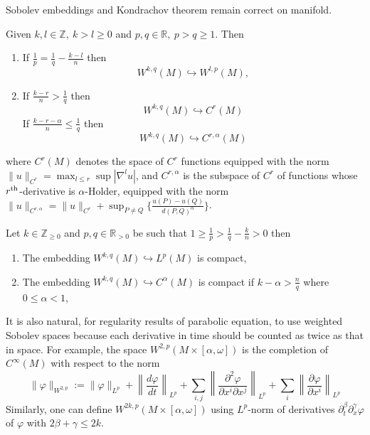 Sobolev embeddings and Kondrachov theorem remain correct on manifold. 

\begin{theorem}
\label{thm:Sobolev-Rn-d}
Given \(k,l\in \mathbb{Z},\ k>l \geq 0\) and \(p,q\in \mathbb{R},\ p>q\geq 1\). Then
\begin{enumerate}
\item If \(\frac{1}{p}= \frac{1}{q} - \frac{k-l}{n}\) then 
\[
    W^{k,q}(M) \hookrightarrow W^{l,p}(M),
   \]
\item If \(\frac{k-r}{n}> \frac{1}{q}\) then
\[
   W^{k,q}(M) \hookrightarrow C^r(M)
   \]
If \(\frac{k-r-\alpha}{n}\leq \frac{1}{q}\) then 
\[ 
   W^{k,q}(M) \hookrightarrow C^{r,\alpha}(M) 
   \]
\end{enumerate}
where \(C^r(M)\) denotes the space of \(C^r\) functions equipped with the norm \(\| u \|_{C^r} = \max_{l\leq
r}\sup|\nabla^l u|\), and \(C^{r,\alpha}\) is the subspace of \(C^r\) of functions
whose \(r^{\rm th}\)-derivative is \(\alpha\)-Holder, equipped with the norm \(\|
u\|_{C^{r,\alpha}} = \| u \|_{C^r} + \sup_{P\ne Q}\{ \frac{u(P) - u(Q)}{d(P,Q)^\alpha} \}\).
\end{theorem}

\begin{theorem}[Kondrachov]
\label{thm:Kondrachov-Rn-d}
Let \(k\in \mathbb{Z}_{\geq 0}\) and \(p,q\in \mathbb{R}_{>0}\) be such that
\(1\geq \frac{1}{p} > \frac{1}{q} - \frac{k}{n} > 0\) then
\begin{enumerate}
\item The embedding \(W^{k,q}(M) \hookrightarrow  L^p(M)\) is compact,
\item The embedding \(W^{k,q}(M) \hookrightarrow  C^\alpha(M)\) is compact if
\(k-\alpha > \frac{n}{q}\) where \(0\leq \alpha < 1\),
\end{enumerate}
\end{theorem}

It is also natural, for regularity results of parabolic equation, to use weighted Sobolev
spaces because each derivative in time should be counted as twice as that in space. For
example, the space \(W^{2,p}(M\times[\alpha,\omega])\) is the completion of \(C^\infty(M)\) with respect to
the norm
\[
 \|\varphi\|_{W^{2,p}} := \|\varphi\|_{L^p} + \left\| \frac{d\varphi}{dt}\right\|_{L^p} + \sum_{i,j} \left\| \frac{\partial^2\varphi}{\partial x^i \partial
x^j} \right\|_{L^p} + \sum_i \left\| \frac{\partial\varphi}{\partial x^i} \right\|_{L^p}
\]
Similarly, one can define \(W^{2k,p}(M\times[\alpha,\omega])\) using \(L^p\)-norm of
derivatives \(\partial_t^\beta \partial_x^\gamma \varphi\) of \(\varphi\) with \(2\beta + \gamma
\leq 2k\).


